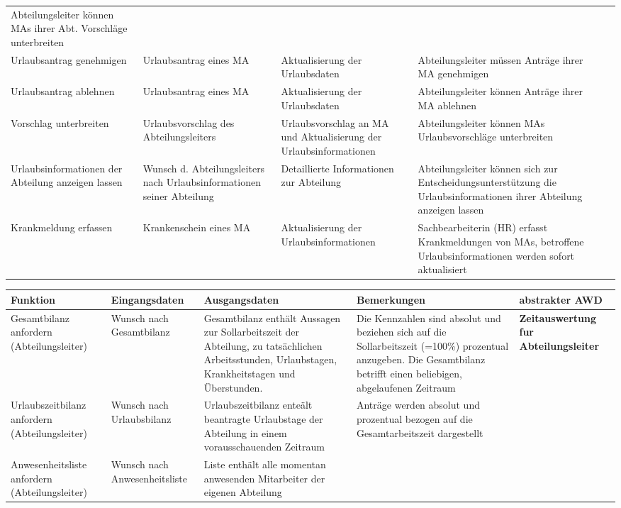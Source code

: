 {\begin{tabular}{|p{3cm}|p{4cm}|p{4cm}|p{4cm}|p{2cm}|}
		Abteilungsleiter k\"onnen MAs ihrer Abt. Vorschl\"age unterbreiten &
		\\
	\cline{1-4}
		Urlaubsantrag genehmigen &
		Urlaubsantrag eines MA &
		Aktualisierung der Urlaubsdaten &
		Abteilungsleiter m\"ussen Antr\"age ihrer MA genehmigen &
		\\
	\cline{1-4}
		Urlaubsantrag ablehnen &
		Urlaubsantrag eines MA &
		Aktualisierung der Urlaubsdaten &
		Abteilungsleiter k\"onnen Antr\"age ihrer MA ablehnen &
		\\
	\cline{1-4}
		Vorschlag unterbreiten &
		Urlaubsvorschlag des Abteilungsleiters &
		Urlaubsvorschlag an MA und Aktualisierung der Urlaubsinformationen &
		Abteilungsleiter k\"onnen MAs Urlaubsvorschl\"age unterbreiten &
		\\
	\cline{1-4}
		Urlaubsinformationen der Abteilung anzeigen lassen &
		Wunsch d. Abteilungsleiters nach Urlaubsinformationen seiner Abteilung &
		Detaillierte Informationen zur Abteilung &
		Abteilungsleiter k\"onnen sich zur Entscheidungsunterst\"utzung die Urlaubsinformationen ihrer Abteilung anzeigen lassen &
		\\
	\hline
		Krankmeldung erfassen &
		Krankenschein eines MA &
		Aktualisierung der Urlaubsinformationen &
		Sachbearbeiterin (HR) erfasst Krankmeldungen von MAs, betroffene Urlaubsinformationen werden sofort aktualisiert &
		 \\
	\hline
	
\end{tabular}
}


\hspace{-3,5cm}
{\footnotesize
\begin{tabular}{|p{3cm}|p{4cm}|p{4cm}|p{4cm}|p{2cm}|}
	\hline
		\textbf{Funktion	} &	
		\textbf{Eingangsdaten} &
		\textbf{Ausgangsdaten}& 
		\textbf{Bemerkungen}	&
		\textbf{abstrakter AWD} \\
	\hline \hline 
		Gesamtbilanz anfordern (Abteilungsleiter) &
		Wunsch nach Gesamtbilanz &
		Gesamtbilanz enth\"alt Aussagen zur Sollarbeitszeit der Abteilung, zu tats\"achlichen Arbeitsstunden, Urlaubstagen, Krankheitstagen und \"Uberstunden.  &
		Die Kennzahlen sind absolut und beziehen sich auf die Sollarbeitszeit (=100\%) prozentual anzugeben. Die Gesamtbilanz betrifft einen beliebigen, abgelaufenen Zeitraum &
		\textbf{Zeitauswertung fur Abteilungsleiter}\\
	\cline{1-4}
		Urlaubszeitbilanz anfordern (Abteilungsleiter) &
		Wunsch nach Urlaubsbilanz &
		Urlaubszeitbilanz ente\"alt beantragte Urlaubstage der Abteilung in einem vorausschauenden Zeitraum &
		Antr\"age werden absolut und prozentual bezogen auf die Gesamtarbeitszeit dargestellt &
		\\ 
	\cline{1-4}
		Anwesenheitsliste anfordern (Abteilungsleiter) &
		Wunsch nach Anwesenheitsliste &
		Liste enth\"alt alle momentan anwesenden Mitarbeiter der eigenen Abteilung &
		&
		\\
	\hline
	
\end{tabular}
}

